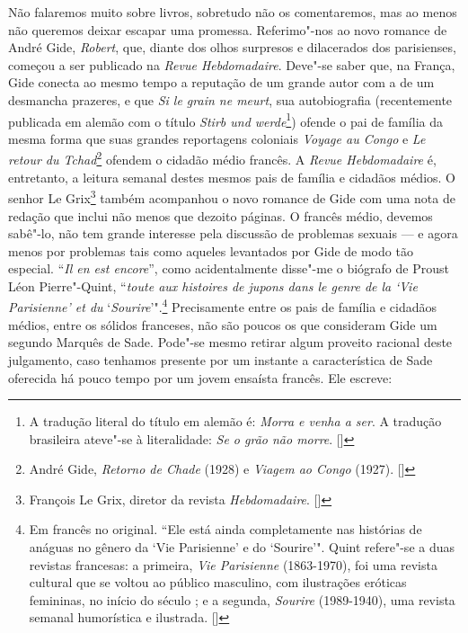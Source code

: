 Não falaremos muito sobre livros, sobretudo não os comentaremos, mas ao
menos não queremos deixar escapar uma promessa. Referimo"-nos ao novo
romance de André Gide, \emph{Robert}, que, diante dos olhos surpresos e
dilacerados dos parisienses, começou a ser publicado na \emph{Revue
Hebdomadaire}. Deve"-se saber que, na França, Gide conecta ao mesmo tempo
a reputação de um grande autor com a de um desmancha prazeres, e que
\emph{Si le grain ne meurt}, sua autobiografia (recentemente publicada
em alemão com o título \emph{Stirb und werde}\footnote{A tradução
  literal do título em alemão é: \emph{Morra e venha a ser}. A tradução
  brasileira ateve"-se à literalidade: \emph{Se o grão não morre}. []})
ofende o pai de família da mesma forma que suas grandes reportagens
coloniais \emph{Voyage au Congo} e \emph{Le retour du Tchad}\footnote{André Gide, \emph{Retorno de Chade} (1928) e \emph{Viagem ao Congo} (1927). []} ofendem
o cidadão médio francês. A \emph{Revue Hebdomadaire} é, entretanto, a
leitura semanal destes mesmos pais de família e cidadãos médios. O
senhor Le Grix\footnote{‎François Le Grix, diretor da revista
  \emph{Hebdomadaire}. []} também acompanhou o novo romance de Gide com uma
nota de redação que inclui não menos que dezoito páginas. O francês
médio, devemos sabê"-lo, não tem grande interesse pela discussão de
problemas sexuais --- e agora menos por problemas tais como aqueles
levantados por Gide de modo tão especial. ``\emph{Il en est encore}'',
como acidentalmente disse"-me o biógrafo de Proust Léon Pierre"-Quint,
``\emph{toute aux histoires de jupons dans le genre de la} \emph{`Vie
Parisienne' et du} `\emph{Sourire}'".\footnote{Em francês no
  original. ``Ele está ainda completamente nas histórias de anáguas no
  gênero da `Vie Parisienne' e do `Sourire'". Quint refere"-se a duas
  revistas francesas: a primeira, \emph{Vie Parisienne}
  (1863-1970), foi uma revista cultural que se voltou ao público
  masculino, com ilustrações eróticas femininas, no início do século ;
  e a segunda, \emph{Sourire} (1989-1940), uma revista semanal
  humorística e ilustrada. []} Precisamente entre os pais de família e
cidadãos médios, entre os sólidos franceses, não são poucos os que
consideram Gide um segundo Marquês de Sade. Pode"-se mesmo retirar algum
proveito racional deste julgamento, caso tenhamos presente por um
instante a característica de Sade oferecida há pouco tempo por um jovem
ensaísta francês. Ele escreve:

